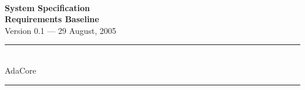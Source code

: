 \begin{titlepage}

\begin{center}
\textbf{\huge \ssat\\[\baselineskip]}
\textbf{\Huge System Specification}\\[\baselineskip]
\textbf{\huge Requirements Baseline}\\[\baselineskip]
{\large Version 0.1 --- 29 August, 2005}\\[\baselineskip]
\end{center}

\vfill

\begin{center}\sc
\rule{\textwidth}{1pt}\\
AdaCore\\

\rule{\textwidth}{1pt}\\
\end{center}

\end{titlepage}
